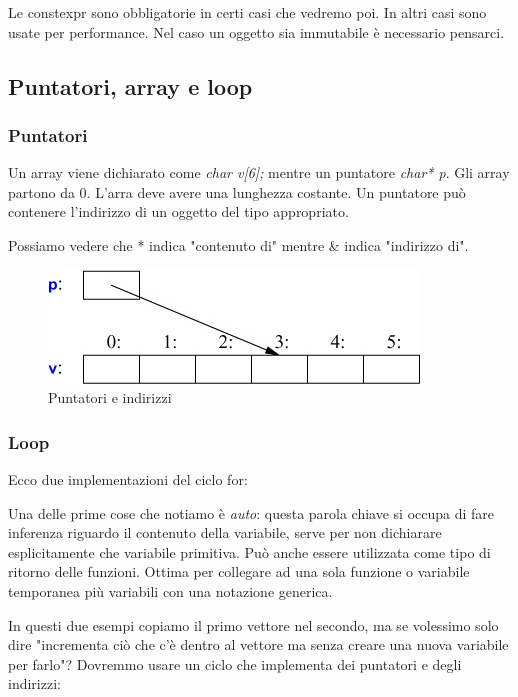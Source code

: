 \documentclass[11pt,a4paper]{book}
\begin{document}
Le constexpr sono obbligatorie in certi casi che vedremo poi. In altri casi sono usate per performance. Nel caso un oggetto sia immutabile è necessario pensarci.

\subsection{Puntatori, array e loop}
\subsubsection{Puntatori}
Un array viene dichiarato come \emph{char v[6];} mentre un puntatore \emph{char* p}. Gli array partono da 0. L'arra deve avere una lunghezza costante. Un puntatore può contenere l'indirizzo di un oggetto del tipo appropriato.
\label{code: 004}

Possiamo vedere che * indica "contenuto di" mentre \& indica "indirizzo di".
\begin{figure}[h!]
	\begin{center}
		\includegraphics[scale=0.6]{img/002.jpg}
		\caption{Puntatori e indirizzi}
		\label{fig: 002}
	\end{center}
\end{figure}

\subsubsection{Loop}
Ecco due implementazioni del ciclo for:
\label{code: 005}
\label{code: 006}

Una delle prime cose che notiamo è \emph{auto}: questa parola chiave si occupa di fare inferenza riguardo il contenuto della variabile, serve per non dichiarare esplicitamente che variabile primitiva. Può anche essere utilizzata come tipo di ritorno delle funzioni. Ottima per collegare ad una sola funzione o variabile temporanea più variabili con una notazione generica.

In questi due esempi copiamo il primo vettore nel secondo, ma se volessimo solo dire "incrementa ciò che c'è dentro al vettore ma senza creare una nuova variabile per farlo"? Dovremmo usare un ciclo che implementa dei puntatori e degli indirizzi:
\label{code: 007}
\end{document}
